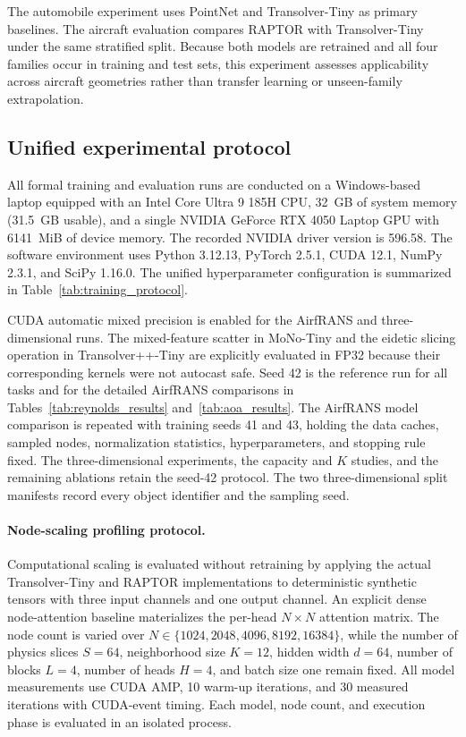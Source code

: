 \documentclass[a4paper,fleqn]{cas-sc}
\begin{document}
The automobile experiment uses PointNet and Transolver-Tiny as primary
baselines. The aircraft evaluation compares RAPTOR with Transolver-Tiny under the same
stratified split. Because both models are retrained and all four families
occur in training and test sets, this experiment assesses applicability
across aircraft geometries rather than transfer learning or unseen-family
extrapolation.

\subsection{Unified experimental protocol}
\label{subsec:protocol}

All formal training and evaluation runs are conducted on a Windows-based laptop equipped with an Intel Core Ultra 9 185H CPU, 32~GB of system memory (31.5~GB usable), and a single NVIDIA GeForce RTX 4050 Laptop GPU with 6141~MiB of device memory. The recorded NVIDIA driver version is 596.58. The software environment uses Python 3.12.13, PyTorch 2.5.1, CUDA 12.1, NumPy 2.3.1, and SciPy 1.16.0.
The unified hyperparameter configuration is summarized in Table~\ref{tab:training_protocol}.

CUDA automatic mixed precision is enabled for the AirfRANS and
three-dimensional runs. The mixed-feature scatter in MoNo-Tiny and the
eidetic slicing operation in Transolver++-Tiny are explicitly evaluated
in FP32 because their corresponding kernels were not autocast safe.
Seed 42 is the reference run for all tasks and for the detailed AirfRANS
comparisons in Tables~\ref{tab:reynolds_results} and~\ref{tab:aoa_results}.
The AirfRANS model comparison is repeated with training seeds 41 and 43,
holding the data caches, sampled nodes, normalization statistics,
hyperparameters, and stopping rule fixed. The three-dimensional
experiments, the capacity and $K$ studies, and the remaining ablations
retain the seed-42 protocol. The two three-dimensional split manifests
record every object identifier and the sampling seed.

\paragraph{Node-scaling profiling protocol.}
Computational scaling is evaluated without retraining by applying the actual
Transolver-Tiny and RAPTOR implementations to deterministic synthetic tensors
with three input channels and one output channel. An explicit dense
node-attention baseline materializes the per-head \(N\times N\) attention
matrix. The node count is varied over
\(N\in\{1024,2048,4096,8192,16384\}\), while the number of physics slices
\(S=64\), neighborhood size \(K=12\), hidden width \(d=64\), number of
blocks \(L=4\), number of heads \(H=4\), and batch size one remain fixed.
All model measurements use CUDA AMP, 10 warm-up iterations, and 30 measured
iterations with CUDA-event timing. Each model, node count, and execution
phase is evaluated in an isolated process.
\end{document}
